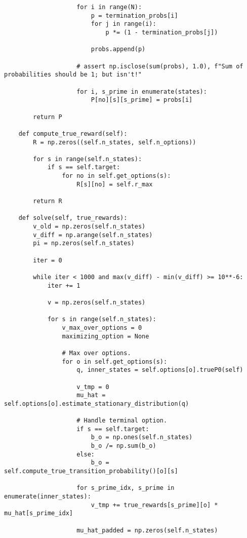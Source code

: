 \begin{verbatim}
                    for i in range(N):
                        p = termination_probs[i]
                        for j in range(i):
                            p *= (1 - termination_probs[j])

                        probs.append(p)

                    # assert np.isclose(sum(probs), 1.0), f"Sum of probabilities should be 1; but isn't!"

                    for i, s_prime in enumerate(states):
                        P[no][s][s_prime] = probs[i]

        return P

    def compute_true_reward(self):
        R = np.zeros((self.n_states, self.n_options))

        for s in range(self.n_states):
            if s == self.target:
                for no in self.get_options(s):
                    R[s][no] = self.r_max

        return R

    def solve(self, true_rewards):
        v_old = np.zeros(self.n_states)
        v_diff = np.arange(self.n_states)
        pi = np.zeros(self.n_states)

        iter = 0

        while iter < 1000 and max(v_diff) - min(v_diff) >= 10**-6:
            iter += 1

            v = np.zeros(self.n_states)

            for s in range(self.n_states):
                v_max_over_options = 0
                maximizing_option = None

                # Max over options.
                for o in self.get_options(s):
                    q, inner_states = self.options[o].trueP0(self)

                    v_tmp = 0
                    mu_hat = self.options[o].estimate_stationary_distribution(q)

                    # Handle terminal option.
                    if s == self.target:
                        b_o = np.ones(self.n_states)
                        b_o /= np.sum(b_o)
                    else:
                        b_o = self.compute_true_transition_probability()[o][s]

                    for s_prime_idx, s_prime in enumerate(inner_states):
                        v_tmp += true_rewards[s_prime][o] * mu_hat[s_prime_idx]

                    mu_hat_padded = np.zeros(self.n_states)


\end{verbatim}
